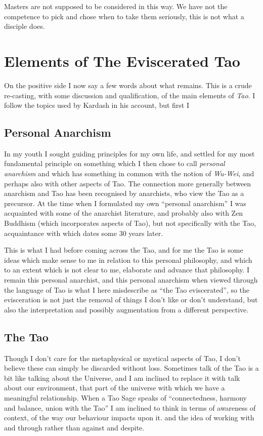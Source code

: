 \documentclass[numreferences]{rbjk}
\begin{document}
\begin{article}
Masters are not supposed to be considered in this way.
We have not the competence to pick and chose when to take them seriously, this is not what a disciple does. 

\section{Elements of The Eviscerated Tao}

On the positive side I now say a few words about what remains.
This is a crude re-casting, with some discussion and qualification, of the main elements of {\it Tao}.
I follow the topics used by Kardash in his account, but first I 

\subsection{Personal Anarchism}

In my youth I sought guiding principles for my own life, and settled for my most fundamental principle on something which I then chose to call {\it personal anarchism} and which has something in common with the notion of {\it Wu-Wei}, and perhaps also with other aspects of Tao.
The connection more generally between anarchism and Tao has been recognised by anarchists, who view the Tao as a precursor.
At the time when I formulated my own ``personal anarchism'' I was acquainted with some of the anarchist literature, and probably also with Zen Buddhism (which incorporates aspects of Tao), but not specifically with the Tao, acquaintance with which dates some 30 years later.

This is what I had before coming across the Tao, and for me the Tao is some ideas which make sense to me in relation to this personal philosophy, and which to an extent which is not clear to me, elaborate and advance that philosophy.
I remain this personal anarchist, and this personal anarchism when viewed through the language of Tao is what I here misdescribe as ``the Tao eviscerated'', so the evisceration is not just the removal of things I don't like or don't understand, but also the interpretation and possibly augmentation from a different perspective.

\subsection{The Tao}

Though I don't care for the metaphysical or mystical aspects of Tao, I don't believe these can simply be discarded without loss.
Sometimes talk of the Tao is a bit like talking about the Universe, and I am inclined to replace it with talk about our environment, that part of the universe with which we have a meaningful relationship.
When a Tao Sage speaks of ``connectedness, harmony and balance, union with the Tao'' I am inclined to think in terms of awareness of context, of the way our behaviour impacts upon it. and the idea of working with and through rather than against and despite.


\end{article}
\end{document}
